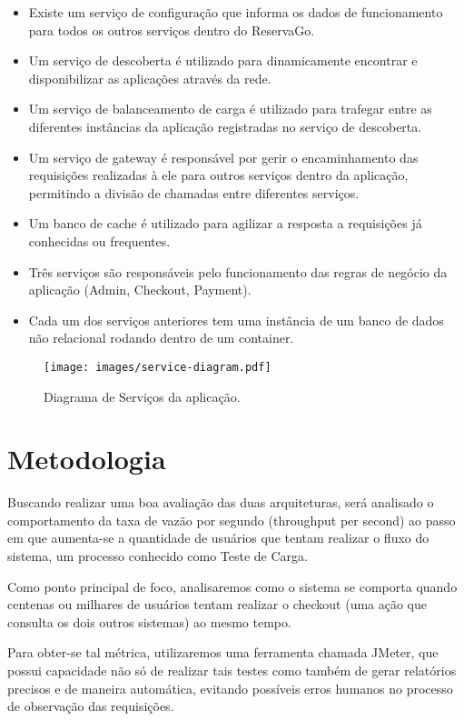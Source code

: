 \documentclass[12pt, openright, oneside, a4paper, article,
  section=TITLE
]{abntex2}
\begin{document}
\begin{itemize}
  \item Existe um serviço de configuração que informa os dados de funcionamento para todos os outros serviços dentro do ReservaGo.
  \item Um serviço de descoberta é utilizado para dinamicamente encontrar e disponibilizar as aplicações através da rede.
  \item Um serviço de balanceamento de carga é utilizado para trafegar entre as diferentes instâncias da aplicação registradas no serviço de descoberta. 
  \item Um serviço de gateway é responsável por gerir o encaminhamento das requisições realizadas à ele para outros serviços dentro da aplicação, permitindo a divisão de chamadas entre diferentes serviços. 
  \item Um banco de cache é utilizado para agilizar a resposta a requisições já conhecidas ou frequentes. 
  \item Três serviços são responsáveis pelo funcionamento das regras de negócio da aplicação (Admin, Checkout, Payment). 
  \item Cada um dos serviços anteriores tem uma instância de um banco de dados não relacional rodando dentro de um container. 
\end{itemize}
  
\begin{figure}[htb]
  \begin{center}
    \texttt{[image: images/service-diagram.pdf]}
  \end{center}
  \caption{Diagrama de Serviços da aplicação.}
\end{figure}

\section{Metodologia}

Buscando realizar uma boa avaliação das duas arquiteturas, será analisado o comportamento da taxa de vazão por segundo (throughput per second) ao passo em que aumenta-se a quantidade de usuários que tentam realizar o fluxo do sistema, um processo conhecido como Teste de Carga. 

Como ponto principal de foco, analisaremos como o sistema se comporta quando centenas ou milhares de usuários tentam realizar o checkout (uma ação que consulta os dois outros sistemas) ao mesmo tempo. 

Para obter-se tal métrica, utilizaremos uma ferramenta chamada JMeter, que possui capacidade não só de realizar tais testes como também de gerar relatórios precisos e de maneira automática, evitando possíveis erros humanos no processo de observação das requisições. 
\end{document}
